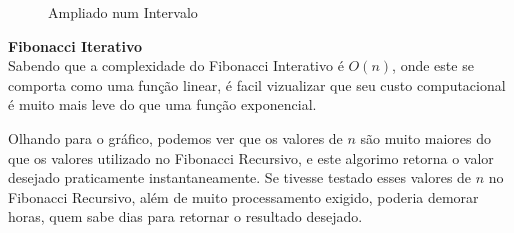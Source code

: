 \documentclass[a4paper, 12pt]{article}
\begin{document}
\begin{figure}[h]
\begin{minipage}[b]{0.45\linewidth}
\caption{Ampliado num Intervalo}
\end{minipage}
\end{figure}
\newpage

{\Large\bf Fibonacci Iterativo}\\

Sabendo que a complexidade do Fibonacci Interativo é $O(n)$, onde este se comporta como uma função linear, é facil vizualizar que seu custo computacional é muito mais leve do que uma função exponencial. 

Olhando para o gráfico, podemos ver que os valores de $n$ são muito maiores do que os valores utilizado no Fibonacci Recursivo, e este algorimo retorna o valor desejado praticamente instantaneamente. Se tivesse testado esses valores de $n$ no Fibonacci Recursivo, além de muito processamento exigido, poderia demorar horas, quem sabe dias para retornar o resultado desejado.
\end{document}
